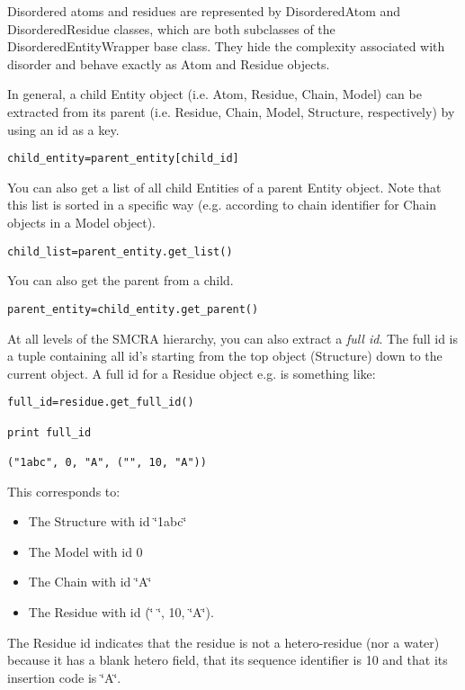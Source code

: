 \documentclass{report}
\begin{document}
Disordered atoms and residues are represented by DisorderedAtom and DisorderedResidue
classes, which are both subclasses of the DisorderedEntityWrapper base class.
They hide the complexity associated with disorder and behave exactly as Atom
and Residue objects.

In general, a child Entity object (i.e. Atom, Residue, Chain, Model) can be
extracted from its parent (i.e. Residue, Chain, Model, Structure, respectively)
by using an id as a key.

\begin{verbatim}
child_entity=parent_entity[child_id]
\end{verbatim}

You can also get a list of all child Entities of a parent Entity object. Note
that this list is sorted in a specific way (e.g. according to chain identifier
for Chain objects in a Model object).

\begin{verbatim}
child_list=parent_entity.get_list()
\end{verbatim}

You can also get the parent from a child.

\begin{verbatim}
parent_entity=child_entity.get_parent()
\end{verbatim}

At all levels of the SMCRA hierarchy, you can also extract a \emph{full id}.
The full id is a tuple containing all id's starting from the top object (Structure)
down to the current object. A full id for a Residue object e.g. is something
like:

\begin{verbatim}
full_id=residue.get_full_id()

print full_id

("1abc", 0, "A", ("", 10, "A"))
\end{verbatim}

This corresponds to:

\begin{itemize}
\item The Structure with id \char`\"{}1abc\char`\"{}
\item The Model with id 0
\item The Chain with id \char`\"{}A\char`\"{}
\item The Residue with id (\char`\"{} \char`\"{}, 10, \char`\"{}A\char`\"{}).
\end{itemize}
The Residue id indicates that the residue is not a hetero-residue (nor a water)
because it has a blank hetero field, that its sequence identifier is 10 and
that its insertion code is \char`\"{}A\char`\"{}.
\end{document}
